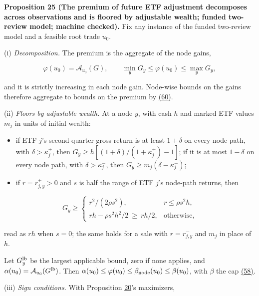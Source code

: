 \documentclass[11pt]{article}
\begin{document}
\label{res:Proposition-25}
\textbf{Proposition 25 (The premium of future ETF adjustment decomposes across observations and is floored by adjustable wealth; funded two-review model; machine checked).}
Fix any instance of the funded two-review model and a feasible root
trade \(u_0\).

(i) \emph{Decomposition.} The premium is the aggregate of the node gains,

\begin{equation*}
\varphi(u_0)=\mathcal A_{u_0}(G),\qquad
\min_yG_y\leq\varphi(u_0)\leq\max_yG_y,\tag{75}\label{eq:75}
\end{equation*}

and it is strictly increasing in each node gain. Node-wise bounds on
the gains therefore aggregate to bounds on the premium by \hyperref[eq:60]{(60)}.

(ii) \emph{Floors by adjustable wealth.} At a node \(y\), with cash \(h\)
and marked ETF values \(m_j\) in units of initial wealth:

\begin{itemize}
  \item if ETF \(j\)'s second-quarter gross return is at least
  \(1+\delta\) on every node path, with \(\delta>\kappa^+_j\), then
  \(G_y\geq h[(1+\delta)/(1+\kappa^+_j)-1]\); if it is at most
  \(1-\delta\) on every node path, with \(\delta>\kappa^-_j\), then
  \(G_y\geq m_j(\delta-\kappa^-_j)\);
  \item if \(r=r^+_{j,y}>0\) and \(s\) is half the range of ETF \(j\)'s
  node-path returns, then
\end{itemize}

\begin{equation*}
G_y\geq
\begin{cases}
r^2/(2\rho s^2), & r\leq\rho s^2h,\\
rh-\rho s^2h^2/2\ \geq\ rh/2, & \text{otherwise},
\end{cases}\tag{76}\label{eq:76}
\end{equation*}

read as \(rh\) when \(s=0\); the same holds for a sale with
  \(r=r^-_{j,y}\) and \(m_j\) in place of \(h\).

Let \(G^{\rm lb}_y\) be the largest applicable bound, zero if none
applies, and \(\alpha(u_0)=\mathcal A_{u_0}(G^{\rm lb})\). Then
\(\alpha(u_0)\leq\varphi(u_0)\leq\beta_{\rm node}(u_0)\leq\beta(u_0)\),
with \(\beta\) the cap \hyperref[eq:58]{(58)}.

(iii) \emph{Sign conditions.} With Proposition \hyperref[res:Proposition-20]{20}'s maximizers,
\end{document}
